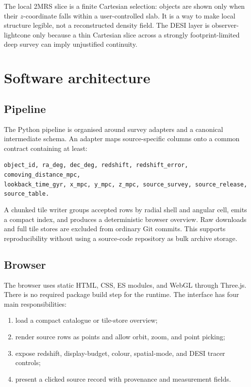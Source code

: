 \documentclass[11pt,a4paper]{article}
\begin{document}
The local 2MRS slice is a finite Cartesian selection: objects are shown only when their $z$-coordinate falls within a user-controlled slab. It is a way to make local structure legible, not a reconstructed density field. The DESI layer is observer-lightcone only because a thin Cartesian slice across a strongly footprint-limited deep survey can imply unjustified continuity.

\section{Software architecture}

\subsection{Pipeline}

The Python pipeline is organised around survey adapters and a canonical intermediate schema. An adapter maps source-specific columns onto a common contract containing at least:

\begin{center}
\small
\texttt{object\_id, ra\_deg, dec\_deg, redshift, redshift\_error, comoving\_distance\_mpc,}\\
\texttt{lookback\_time\_gyr, x\_mpc, y\_mpc, z\_mpc, source\_survey, source\_release, source\_table.}
\end{center}

A chunked tile writer groups accepted rows by radial shell and angular cell, emits a compact index, and produces a deterministic browser overview. Raw downloads and full tile stores are excluded from ordinary Git commits. This supports reproducibility without using a source-code repository as bulk archive storage.

\subsection{Browser}

The browser uses static HTML, CSS, ES modules, and WebGL through Three.js. There is no required package build step for the runtime. The interface has four main responsibilities:

\begin{enumerate}[leftmargin=1.4em]
\item load a compact catalogue or tile-store overview;
\item render source rows as points and allow orbit, zoom, and point picking;
\item expose redshift, display-budget, colour, spatial-mode, and DESI tracer controls;
\item present a clicked source record with provenance and measurement fields.
\end{enumerate}
\end{document}
